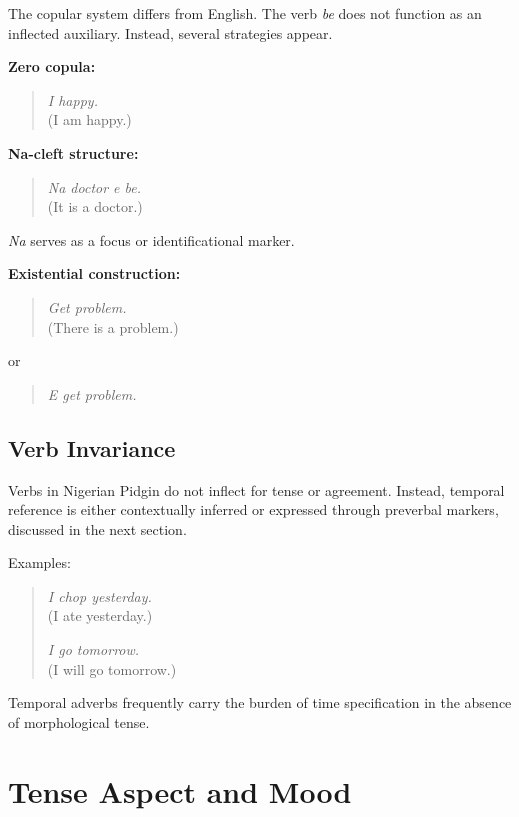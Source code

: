\documentclass[12pt]{article}
\begin{document}
The copular system differs from English. The verb \textit{be} does not function as an inflected auxiliary. Instead, several strategies appear.

\textbf{Zero copula:}

\begin{quote}
\textit{I happy.} \\
(I am happy.)
\end{quote}

\textbf{Na-cleft structure:}

\begin{quote}
\textit{Na doctor e be.} \\
(It is a doctor.)
\end{quote}

\textit{Na} serves as a focus or identificational marker.

\textbf{Existential construction:}

\begin{quote}
\textit{Get problem.} \\
(There is a problem.)
\end{quote}

or

\begin{quote}
\textit{E get problem.}
\end{quote}

\subsection{Verb Invariance}

Verbs in Nigerian Pidgin do not inflect for tense or agreement. Instead, temporal reference is either contextually inferred or expressed through preverbal markers, discussed in the next section.

Examples:

\begin{quote}
\textit{I chop yesterday.} \\
(I ate yesterday.)

\textit{I go tomorrow.} \\
(I will go tomorrow.)
\end{quote}

Temporal adverbs frequently carry the burden of time specification in the absence of morphological tense.

\section{Tense Aspect and Mood}
\end{document}
